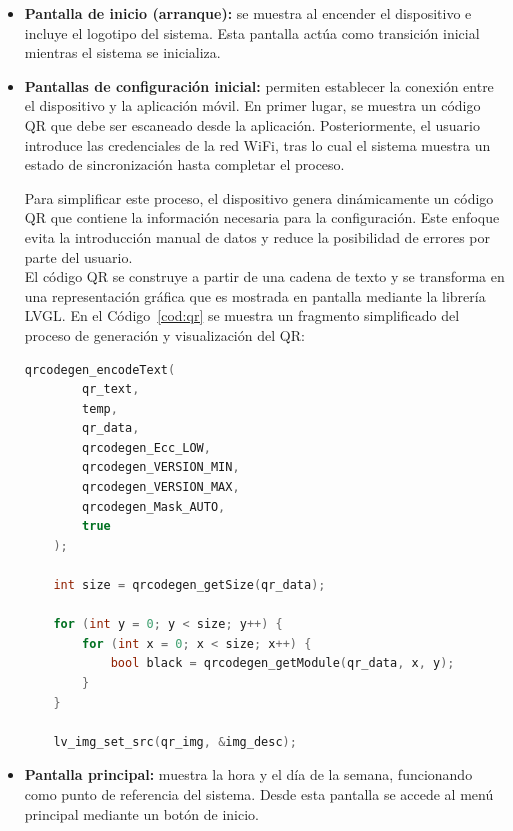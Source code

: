 \begin{itemize}

    \item \textbf{Pantalla de inicio (arranque):} se muestra al encender el dispositivo e incluye el logotipo del sistema. Esta pantalla actúa como transición inicial mientras el sistema se inicializa.

    \item \textbf{Pantallas de configuración inicial:} permiten establecer la conexión entre el dispositivo y la aplicación móvil. En primer lugar, se muestra un código QR que debe ser escaneado desde la aplicación. Posteriormente, el usuario introduce las credenciales de la red WiFi, tras lo cual el sistema muestra un estado de sincronización hasta completar el proceso.

    Para simplificar este proceso, el dispositivo genera dinámicamente un código QR que contiene la información necesaria para la configuración. Este enfoque evita la introducción manual de datos y reduce la posibilidad de errores por parte del usuario.\\

    El código QR se construye a partir de una cadena de texto y se transforma en una representación gráfica que es mostrada en pantalla mediante la librería LVGL. En el Código~\ref{cod:qr} se muestra un fragmento simplificado del proceso de generación y visualización del QR:

    \begin{code}[H]
    \begin{lstlisting}[language=C++]
    qrcodegen_encodeText(
        qr_text,
        temp,
        qr_data,
        qrcodegen_Ecc_LOW,
        qrcodegen_VERSION_MIN,
        qrcodegen_VERSION_MAX,
        qrcodegen_Mask_AUTO,
        true
    );

    int size = qrcodegen_getSize(qr_data);

    for (int y = 0; y < size; y++) {
        for (int x = 0; x < size; x++) {
            bool black = qrcodegen_getModule(qr_data, x, y);
        }
    }

    lv_img_set_src(qr_img, &img_desc);
    \end{lstlisting}
    \caption{Generación y renderizado de un código QR en el dispositivo}
    \label{cod:qr}
    \end{code}

    \item \textbf{Pantalla principal:} muestra la hora y el día de la semana, funcionando como punto de referencia del sistema. Desde esta pantalla se accede al menú principal mediante un botón de inicio.


\end{itemize}
